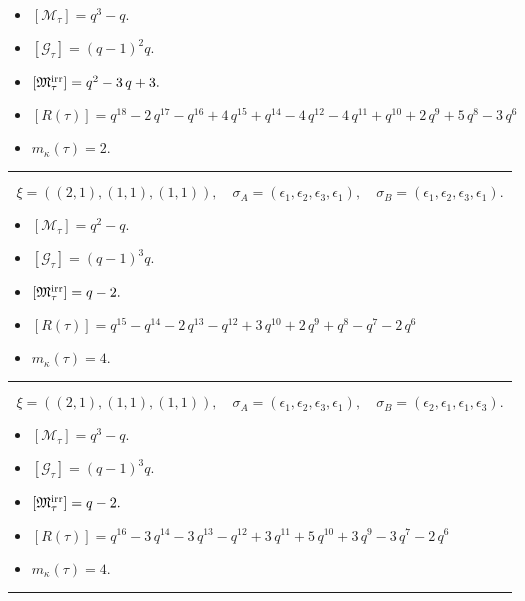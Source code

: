 \documentclass[10pt,a4paper]{amsart}
\begin{document}
\begin{itemize}
 \item $[\mathcal{M}_{\tau}] = q^{3} - q .$

 \item $[\mathcal{G}_{\tau}] = {\left(q - 1\right)}^{2} q .$

 \item $[{\frak M}_{\tau}^{\textrm{irr}}] = q^{2} - 3 \, q + 3 .$

 \item $[R(\tau)] = q^{18} - 2 \, q^{17} - q^{16} + 4 \, q^{15} + q^{14} - 4 \, q^{12} - 4 \, q^{11} + q^{10} + 2 \, q^{9} + 5 \, q^{8} - 3 \, q^{6} $

 \item $m_{\kappa}(\tau) = 2 .$

 \end{itemize}
\noindent\rule{8cm}{0.4pt}

$$\xi = ({(2, 1), (1, 1)}, {(1, 1)}),\quad \sigma_A = ({{\epsilon_1, \epsilon_2}, {\epsilon_3}}, {{\epsilon_1}}),\quad \sigma_B = ({{\epsilon_1, \epsilon_2}, {\epsilon_3}}, {{\epsilon_1}}).$$

\begin{itemize}
 \item $[\mathcal{M}_{\tau}] = q^{2} - q .$

 \item $[\mathcal{G}_{\tau}] = {\left(q - 1\right)}^{3} q .$

 \item $[{\frak M}_{\tau}^{\textrm{irr}}] = q - 2 .$

 \item $[R(\tau)] = q^{15} - q^{14} - 2 \, q^{13} - q^{12} + 3 \, q^{10} + 2 \, q^{9} + q^{8} - q^{7} - 2 \, q^{6} $

 \item $m_{\kappa}(\tau) = 4 .$

 \end{itemize}
\noindent\rule{8cm}{0.4pt}

$$\xi = ({(2, 1), (1, 1)}, {(1, 1)}),\quad \sigma_A = ({{\epsilon_1, \epsilon_2}, {\epsilon_3}}, {{\epsilon_1}}),\quad \sigma_B = ({{\epsilon_2, \epsilon_1}, {\epsilon_1}}, {{\epsilon_3}}).$$

\begin{itemize}
 \item $[\mathcal{M}_{\tau}] = q^{3} - q .$

 \item $[\mathcal{G}_{\tau}] = {\left(q - 1\right)}^{3} q .$

 \item $[{\frak M}_{\tau}^{\textrm{irr}}] = q - 2 .$

 \item $[R(\tau)] = q^{16} - 3 \, q^{14} - 3 \, q^{13} - q^{12} + 3 \, q^{11} + 5 \, q^{10} + 3 \, q^{9} - 3 \, q^{7} - 2 \, q^{6} $

 \item $m_{\kappa}(\tau) = 4 .$

 \end{itemize}
\noindent\rule{8cm}{0.4pt}
\end{document}
